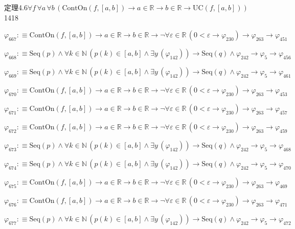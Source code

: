 \begin{fullproof}{定理4.6}{$\forall f\,\forall a\,\forall b\,(\mathrm{ContOn}(f,[a,b]) \to a \in \mathbb{R} \to b \in \mathbb{R} \to \mathrm{UC}(f,[a,b]))$}{1418}
\begin{abbrevlist}
\item $\varphi_{667} :\equiv \mathrm{ContOn}(f,[a,b]) \to a \in \mathbb{R} \to b \in \mathbb{R} \to \neg \forall \varepsilon \in \mathbb{R}\,(0 < \varepsilon \to \varphi_{230}) \to \varphi_{263} \to \varphi_{451}$
\item $\varphi_{668} :\equiv \mathrm{Seq}(p) \land \forall k \in \mathbb{N}\,(p(k) \in [a,b] \land \exists y\,(\varphi_{142})) \to \mathrm{Seq}(q) \land \varphi_{242} \to \varphi_{5} \to \varphi_{456}$
\item $\varphi_{669} :\equiv \mathrm{Seq}(p) \land \forall k \in \mathbb{N}\,(p(k) \in [a,b] \land \exists y\,(\varphi_{142})) \to \mathrm{Seq}(q) \land \varphi_{242} \to \varphi_{5} \to \varphi_{461}$
\item $\varphi_{670} :\equiv \mathrm{ContOn}(f,[a,b]) \to a \in \mathbb{R} \to b \in \mathbb{R} \to \neg \forall \varepsilon \in \mathbb{R}\,(0 < \varepsilon \to \varphi_{230}) \to \varphi_{263} \to \varphi_{453}$
\item $\varphi_{671} :\equiv \mathrm{ContOn}(f,[a,b]) \to a \in \mathbb{R} \to b \in \mathbb{R} \to \neg \forall \varepsilon \in \mathbb{R}\,(0 < \varepsilon \to \varphi_{230}) \to \varphi_{263} \to \varphi_{457}$
\item $\varphi_{672} :\equiv \mathrm{ContOn}(f,[a,b]) \to a \in \mathbb{R} \to b \in \mathbb{R} \to \neg \forall \varepsilon \in \mathbb{R}\,(0 < \varepsilon \to \varphi_{230}) \to \varphi_{263} \to \varphi_{459}$
\item $\varphi_{673} :\equiv \mathrm{Seq}(p) \land \forall k \in \mathbb{N}\,(p(k) \in [a,b] \land \exists y\,(\varphi_{142})) \to \mathrm{Seq}(q) \land \varphi_{242} \to \varphi_{5} \to \varphi_{468}$
\item $\varphi_{674} :\equiv \mathrm{Seq}(p) \land \forall k \in \mathbb{N}\,(p(k) \in [a,b] \land \exists y\,(\varphi_{142})) \to \mathrm{Seq}(q) \land \varphi_{242} \to \varphi_{5} \to \varphi_{470}$
\item $\varphi_{675} :\equiv \mathrm{ContOn}(f,[a,b]) \to a \in \mathbb{R} \to b \in \mathbb{R} \to \neg \forall \varepsilon \in \mathbb{R}\,(0 < \varepsilon \to \varphi_{230}) \to \varphi_{263} \to \varphi_{469}$
\item $\varphi_{676} :\equiv \mathrm{ContOn}(f,[a,b]) \to a \in \mathbb{R} \to b \in \mathbb{R} \to \neg \forall \varepsilon \in \mathbb{R}\,(0 < \varepsilon \to \varphi_{230}) \to \varphi_{263} \to \varphi_{471}$
\item $\varphi_{677} :\equiv \mathrm{Seq}(p) \land \forall k \in \mathbb{N}\,(p(k) \in [a,b] \land \exists y\,(\varphi_{142})) \to \mathrm{Seq}(q) \land \varphi_{242} \to \varphi_{5} \to \varphi_{472}$

\end{abbrevlist}
\end{fullproof}
